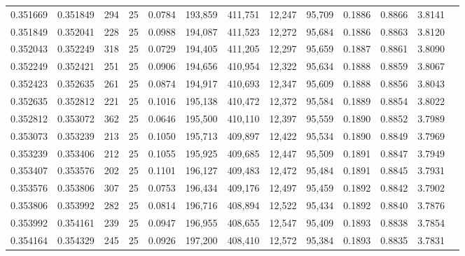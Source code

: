 \begin{tabular}{rrrrrrrrrrrrr}
0.351669 & 0.351849 &   294 &  25 &                                     0.0784 & 193,859 & 411,751 &  12,247 &  95,709 & 0.1886 & 0.8866 & 3.8141 \\
0.351849 & 0.352041 &   228 &  25 &                                     0.0988 & 194,087 & 411,523 &  12,272 &  95,684 & 0.1886 & 0.8863 & 3.8120 \\
0.352043 & 0.352249 &   318 &  25 &                                     0.0729 & 194,405 & 411,205 &  12,297 &  95,659 & 0.1887 & 0.8861 & 3.8090 \\
0.352249 & 0.352421 &   251 &  25 &                                     0.0906 & 194,656 & 410,954 &  12,322 &  95,634 & 0.1888 & 0.8859 & 3.8067 \\
0.352423 & 0.352635 &   261 &  25 &                                     0.0874 & 194,917 & 410,693 &  12,347 &  95,609 & 0.1888 & 0.8856 & 3.8043 \\
0.352635 & 0.352812 &   221 &  25 &                                     0.1016 & 195,138 & 410,472 &  12,372 &  95,584 & 0.1889 & 0.8854 & 3.8022 \\
0.352812 & 0.353072 &   362 &  25 &                                     0.0646 & 195,500 & 410,110 &  12,397 &  95,559 & 0.1890 & 0.8852 & 3.7989 \\
0.353073 & 0.353239 &   213 &  25 &                                     0.1050 & 195,713 & 409,897 &  12,422 &  95,534 & 0.1890 & 0.8849 & 3.7969 \\
0.353239 & 0.353406 &   212 &  25 &                                     0.1055 & 195,925 & 409,685 &  12,447 &  95,509 & 0.1891 & 0.8847 & 3.7949 \\
0.353407 & 0.353576 &   202 &  25 &                                     0.1101 & 196,127 & 409,483 &  12,472 &  95,484 & 0.1891 & 0.8845 & 3.7931 \\
0.353576 & 0.353806 &   307 &  25 &                                     0.0753 & 196,434 & 409,176 &  12,497 &  95,459 & 0.1892 & 0.8842 & 3.7902 \\
0.353806 & 0.353992 &   282 &  25 &                                     0.0814 & 196,716 & 408,894 &  12,522 &  95,434 & 0.1892 & 0.8840 & 3.7876 \\
0.353992 & 0.354161 &   239 &  25 &                                     0.0947 & 196,955 & 408,655 &  12,547 &  95,409 & 0.1893 & 0.8838 & 3.7854 \\
0.354164 & 0.354329 &   245 &  25 &                                     0.0926 & 197,200 & 408,410 &  12,572 &  95,384 & 0.1893 & 0.8835 & 3.7831 \\

\end{tabular}
